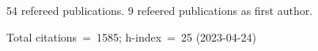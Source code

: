 54 refereed publications. 9 refeered publications as first author.

Total citations~=~1585; h-index~=~25 (2023-04-24)